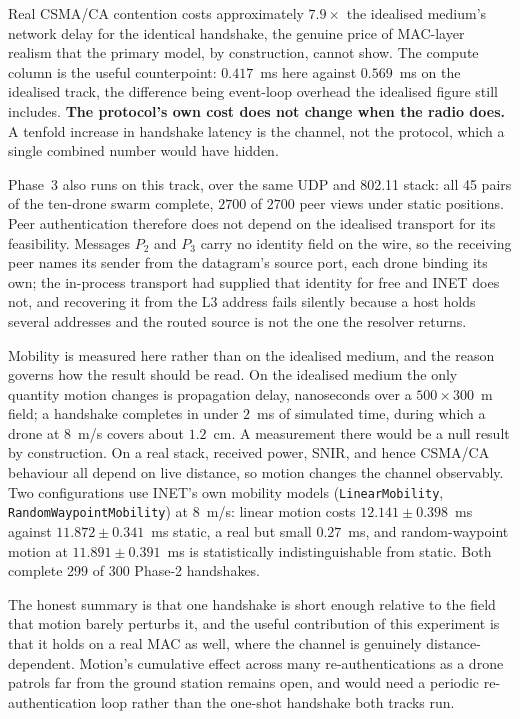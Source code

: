 \documentclass[journal]{IEEEtran}
\begin{document}
Real CSMA/CA contention costs approximately $7.9\times$ the idealised medium's
network delay for the identical handshake, the genuine price of MAC-layer
realism that the primary model, by construction, cannot show. The compute column
is the useful counterpoint: $0.417$~ms here against $0.569$~ms on the idealised
track, the difference being event-loop overhead the idealised figure still
includes. \textbf{The protocol's own cost does not change when the radio does.}
A tenfold increase in handshake latency is the channel, not the protocol, which
a single combined number would have hidden.

Phase~3 also runs on this track, over the same UDP and 802.11 stack: all 45
pairs of the ten-drone swarm complete, $2700$ of $2700$ peer views under static
positions. Peer authentication therefore does not depend on the idealised
transport for its feasibility. Messages $P_2$ and $P_3$ carry no identity field
on the wire, so the receiving peer names its sender from the datagram's source
port, each drone binding its own; the in-process transport had supplied that
identity for free and INET does not, and recovering it from the L3 address fails
silently because a host holds several addresses and the routed source is not the
one the resolver returns.

Mobility is measured here rather than on the idealised medium, and the reason
governs how the result should be read. On the idealised medium the only quantity
motion changes is propagation delay, nanoseconds over a $500\times300$~m field;
a handshake completes in under $2$~ms of simulated time, during which a drone at
8~m/s covers about $1.2$~cm. A measurement there would be a null result by
construction. On a real stack, received power, SNIR, and hence CSMA/CA
behaviour all depend on live distance, so motion changes the channel
observably. Two configurations use INET's own mobility models
(\texttt{LinearMobility}, \texttt{RandomWaypointMobility}) at 8~m/s: linear
motion costs $12.141{\pm}0.398$~ms against $11.872{\pm}0.341$~ms static, a real
but small $0.27$~ms, and random-waypoint motion at $11.891{\pm}0.391$~ms is
statistically indistinguishable from static. Both complete 299 of 300 Phase-2
handshakes.

The honest summary is that one handshake is short enough relative to the field
that motion barely perturbs it, and the useful contribution of this experiment
is that it holds on a real MAC as well, where the channel is genuinely
distance-dependent. Motion's cumulative effect across many re-authentications as
a drone patrols far from the ground station remains open, and would need a
periodic re-authentication loop rather than the one-shot handshake both tracks
run.
\end{document}
